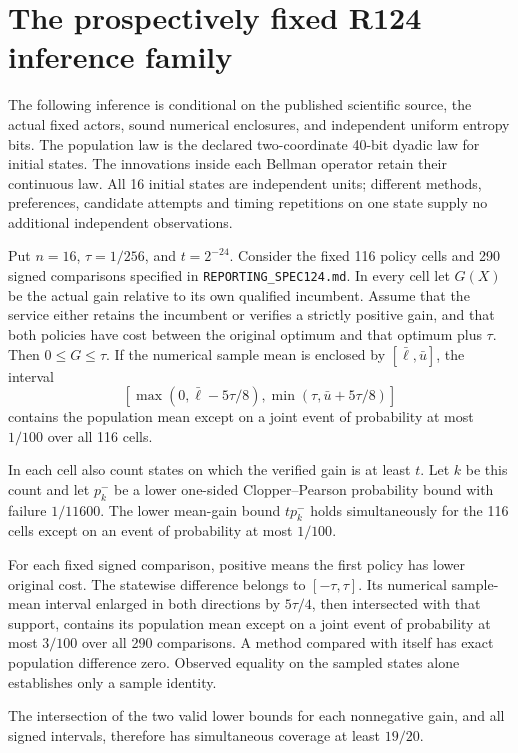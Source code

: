 \section{The prospectively fixed R124 inference family}
\label{supp:inference124}
The following inference is conditional on the published scientific source,
the actual fixed actors, sound numerical enclosures, and independent uniform
entropy bits. The population law is the declared two-coordinate 40-bit
dyadic law for initial states. The innovations inside each Bellman operator
retain their continuous law. All 16 initial states are independent units;
different methods, preferences, candidate attempts and timing repetitions
on one state supply no additional independent observations.

\begin{proposition}
\label{prop:inference124}
Put $n=16$, $\tau=1/256$, and $t=2^{-24}$. Consider the fixed 116
policy cells and 290 signed comparisons specified in
\texttt{REPORTING\_SPEC124.md}. In every cell let $G(X)$ be the actual
gain relative to its own qualified incumbent. Assume that the service
either retains the incumbent or verifies a strictly positive gain, and
that both policies have cost between the original optimum and that
optimum plus $\tau$. Then $0\le G\le\tau$.
If the numerical sample mean is enclosed by $[\bar\ell,\bar u]$,
the interval
\[
 [\max(0,\bar\ell-5\tau/8),
       \min(\tau,\bar u+5\tau/8)]
\]
contains the population mean except on a joint event of probability at
most $1/100$ over all 116 cells.

In each cell also count states on which the verified gain is at least
$t$. Let $k$ be this count and let $p_k^-$ be a lower one-sided
Clopper--Pearson probability bound with failure $1/11600$.
The lower mean-gain bound $t p_k^-$ holds simultaneously for the 116
cells except on an event of probability at most $1/100$.

For each fixed signed comparison, positive means the first policy has
lower original cost. The statewise difference belongs to
$[-\tau,\tau]$. Its numerical sample-mean interval enlarged in both
directions by $5\tau/4$, then intersected with that support, contains
its population mean except on a joint event of probability at most
$3/100$ over all 290 comparisons. A method compared with itself has
exact population difference zero. Observed equality on the sampled
states alone establishes only a sample identity.

The intersection of the two valid lower bounds for each nonnegative
gain, and all signed intervals, therefore has simultaneous coverage
at least $19/20$.
\end{proposition}

